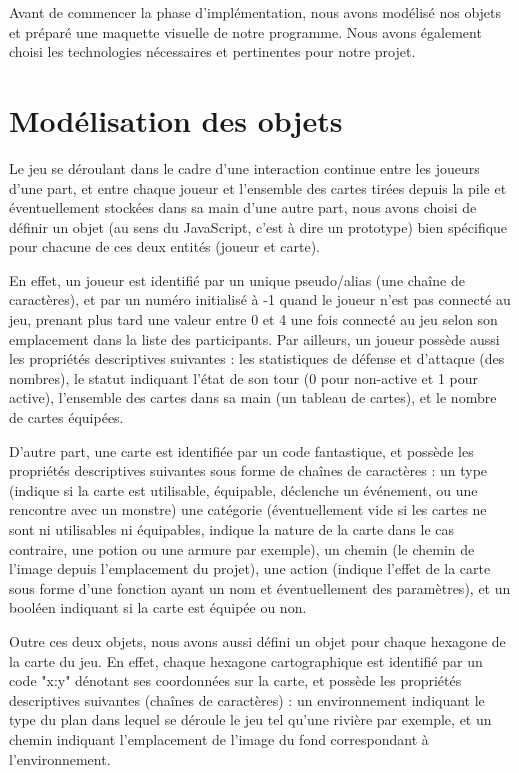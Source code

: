 \documentclass[12pt]{report}
\begin{document}
	Avant de commencer la phase d'implémentation, nous avons modélisé nos objets et préparé une maquette visuelle de notre programme. Nous avons également choisi les technologies nécessaires et pertinentes pour notre projet.

  \section{Modélisation des objets}
	Le jeu se déroulant dans le cadre d'une interaction continue entre les joueurs d'une part, et entre chaque joueur et l'ensemble des cartes tirées depuis la pile et éventuellement stockées dans sa main d'une autre part, nous avons choisi de définir un objet (au sens du JavaScript, c'est à dire un prototype) bien spécifique pour chacune de ces deux entités (joueur et carte).

	En effet, un joueur est identifié par un unique pseudo/alias (une chaîne de caractères), et par un numéro initialisé à -1 quand le joueur n'est pas connecté au jeu, prenant plus tard une valeur entre 0 et 4 une fois connecté au jeu selon son emplacement dans la liste des participants. Par ailleurs, un joueur possède aussi les propriétés descriptives suivantes : les statistiques de défense et d'attaque (des nombres), le statut indiquant l'état de son tour (0 pour non-active et 1 pour active), l'ensemble des cartes dans sa main (un tableau de cartes), et le nombre de cartes équipées.

	D'autre part, une carte est identifiée par un code fantastique, et possède les propriétés descriptives suivantes sous forme de chaînes de caractères : un type (indique si la carte est utilisable, équipable, déclenche un événement, ou une rencontre avec un monstre) une catégorie (éventuellement vide si les cartes ne sont ni utilisables ni équipables, indique la nature de la carte dans le cas contraire, une potion ou une armure par exemple), un chemin (le chemin de l'image depuis l'emplacement du projet), une action (indique l'effet de la carte sous forme d'une fonction ayant un nom et éventuellement des paramètres), et un booléen indiquant si la carte est équipée ou non.

	Outre ces deux objets, nous avons aussi défini un objet pour chaque hexagone de la carte du jeu. En effet, chaque hexagone cartographique est identifié par un code "x:y" dénotant ses coordonnées sur la carte, et possède les propriétés descriptives suivantes (chaînes de caractères) : un environnement indiquant le type du plan dans lequel se déroule le jeu tel qu'une rivière par exemple, et un chemin indiquant l'emplacement de l'image du fond correspondant à l'environnement.
\end{document}
